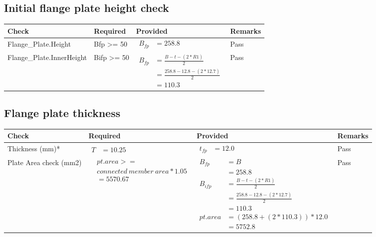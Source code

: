 \documentclass{article}%
\begin{document}
%
\newpage%
\subsection{Initial flange plate height check}%
\label{subsec:Initialflangeplateheightcheck}%
\renewcommand{\arraystretch}{1.2}%
\begin{longtable}{|p{4.5cm}|p{2.5cm}|p{7cm}|p{1.5cm}|}%
\hline%
\rowcolor{OsdagGreen}%
Check&Required&Provided&Remarks\\%
\hline%
\endhead%
\hline%
Flange\_Plate.Height&Bfp >= 50&$\begin{aligned} B_{fp} &=258.8\end{aligned}$&Pass\\%
\hline%
Flange\_Plate.InnerHeight&Bifp >= 50&$\begin{aligned} B_{fp} &= \frac{B-t-(2*R1)}{2}\\ &=\frac{258.8-12.8-(2*12.7)}{2}\\ &= 110.3\end{aligned}$&Pass\\%
\hline%
\end{longtable}

%
\newpage%
\subsection{Flange plate thickness}%
\label{subsec:Flangeplatethickness}%
\renewcommand{\arraystretch}{1.2}%
\begin{longtable}{|p{2.5cm}|p{5cm}|p{6.5cm}|p{1.5cm}|}%
\hline%
\rowcolor{OsdagGreen}%
Check&Required&Provided&Remarks\\%
\hline%
\endhead%
\hline%
Thickness (mm)*&$\begin{aligned} T &=10.25\end{aligned}$&$\begin{aligned} t_{fp} &=12.0\end{aligned}$&Pass\\%
\hline%
Plate Area check (mm2)&$\begin{aligned} &pt.area >= \\&connected~member~area * 1.05\\  &= 5570.67\end{aligned}$&$\begin{aligned} B_{fp} &= B\\ &= 258.8 \\ B_{ifp} &= \frac{B-t-(2*R1)}{2}\\ &=\frac{258.8-12.8-(2*12.7)}{2}\\ &= 110.3 \\  pt.area &=(258.8+(2*110.3))*12.0\\ &= 5752.8\end{aligned}$&Pass\\%
\hline%
\end{longtable}
\end{document}
